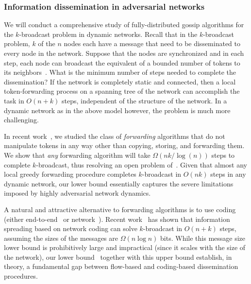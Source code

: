 \subsubsection{Information dissemination in adversarial networks} 
We will conduct a comprehensive study of fully-distributed gossip
algorithms for the $k$-broadcast problem in dynamic networks.  Recall
that in the $k$-broadcast problem, $k$ of the $n$ nodes each have a
message that need to be disseminated to every node in the network.
Suppose that the nodes are synchronized and in each step, each node
can broadcast the equivalent of a bounded number of tokens to its
neighbors~\cite{kuhn+lo:dynamic}.  What is the minimum number of steps
needed to complete the dissemination?  If the network is completely
static and connected, then a local token-forwarding process on a
spanning tree of the network can accomplish the task in $O(n + k)$
steps, independent of the structure of the network.  In a dynamic
network as in the above model however, the problem is much more
challenging.

In recent work~\cite{dutta+prs:dynamic}, we studied the class of {\em
  forwarding}\/ algorithms that do not manipulate tokens in any way
other than copying, storing, and forwarding them.  We show that {\em
  any}\/ forwarding algorithm will take $\Omega(nk/\log(n))$ steps to
complete $k$-broadcast, thus resolving an open problem
of~\cite{kuhn+lo:dynamic}.  Given that almost any local greedy
forwarding procedure completes $k$-broadcast in $O(nk)$ steps in any
dynamic network, our lower bound essentially captures the severe
limitations imposed by highly adversarial network dynamics.

A natural and attractive alternative to forwarding algorithms is to
use coding (either end-to-end~\cite{Byers02adigital,Shok06} or
network~\cite{ahlswede+cly:coding}).  Recent
work~\cite{haeupler:gossip,haeupler+k:dynamic} has shown that
information spreading based on network coding can solve $k$-broadcast
in $O(n+k)$ steps, assuming the sizes of the messages are $\Omega(n
\log n)$ bits.  While this message size lower bound is prohibitively
large and impractical (since it scales with the size of the network),
our lower bound~\cite{dutta+prs:dynamic} together with this upper
bound establish, in theory, a fundamental gap between flow-based and
coding-based dissemination procedures.

